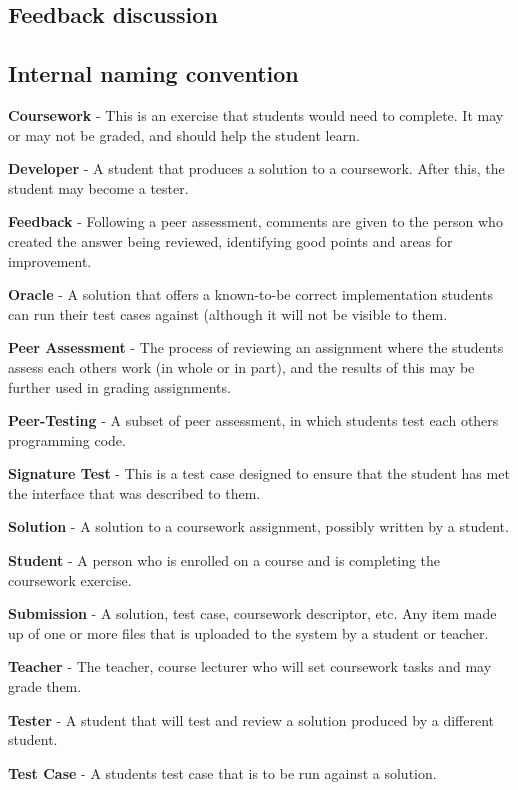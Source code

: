 \documentclass[sigplan,10pt,review]{acmart}\settopmatter{printfolios=true}
\begin{document}
\subsection{Feedback discussion}



\subsection{Internal naming convention}
\textbf{Coursework} - This is an exercise that students would need to 
complete. It may or may not be graded, and should help the student 
learn.

\textbf{Developer} - A student that produces a solution to a 
coursework. After this, the student may become a tester.

\textbf{Feedback} - Following a peer assessment, comments are given to
the person who created the answer being reviewed, identifying good 
points and areas for improvement.

\textbf{Oracle} - A solution that offers a known-to-be correct 
implementation students can run their test cases against (although it
 will not be visible to them.

\textbf{Peer Assessment} - The process of reviewing an assignment 
where the students assess each others work (in whole or in part), and
 the results of this may be further used in grading assignments.

\textbf{Peer-Testing} - A subset of peer assessment, in which students
 test each others programming code.

\textbf{Signature Test} - This is a test case designed to ensure that
 the student has met the interface that was described to them.

\textbf{Solution} - A solution to a coursework assignment, possibly 
written by a student.

\textbf{Student} - A person who is enrolled on a course and is 
completing the coursework exercise.

\textbf{Submission} - A solution, test case, coursework descriptor, 
etc. Any item made up of one or more files that is uploaded to the 
system by a student or teacher.

\textbf{Teacher} - The teacher, course lecturer who will set 
coursework tasks and may grade them.

\textbf{Tester} - A student that will test and review a solution 
produced by a different student.

\textbf{Test Case} - A students test case that is to be run 
against a solution.
\end{document}
